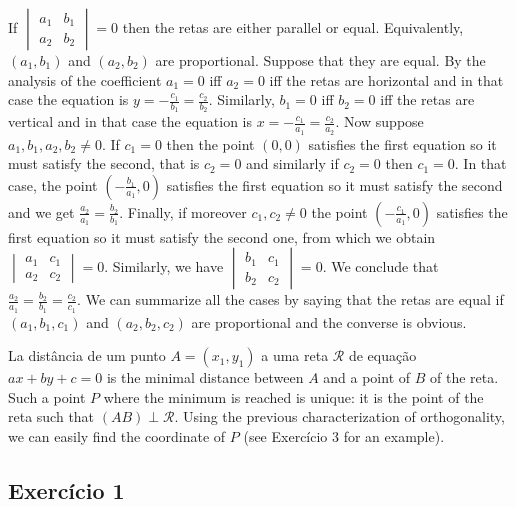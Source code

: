 If $\begin{vmatrix}
a_1 & b_1 \\
a_2 & b_2
\end{vmatrix} = 0$ then the retas are either parallel or equal. Equivalently,
$(a_1,b_1)$ and $(a_2,b_2)$ are proportional.
Suppose that they are equal. By the analysis of the coefficient
$a_1 = 0$ iff $a_2 = 0$ iff the retas are horizontal and in that case
the equation is $y = -\frac{c_1}{b_1} = \frac{c_2}{b_2}$.
Similarly, $b_1 = 0$ iff $b_2 = 0$ iff the retas are vertical
and in that case
the equation is $x = -\frac{c_1}{a_1} = \frac{c_2}{a_2}$.
Now suppose $a_1, b_1, a_2, b_2 \neq 0$. If $c_1 = 0$ then the point $(0,0)$
satisfies the first equation so it must satisfy the second, that is $c_2 = 0$
and similarly if $c_2=0$ then $c_1=0$. In that case, the point
$\left(-\frac{b_1}{a_1}, 0\right)$ satisfies the first equation so
it must satisfy the second and we get $\frac{a_2}{a_1} = \frac{b_2}{b_1}$.
Finally, if moreover $c_1,c_2 \neq 0$ the point
$\left(-\frac{c_1}{a_1}, 0\right)$ satisfies the first equation so it must
satisfy the second one, from which we obtain
$\begin{vmatrix}
a_1 & c_1 \\
a_2 & c_2
\end{vmatrix} = 0$. Similarly, we have $\begin{vmatrix}
b_1 & c_1 \\
b_2 & c_2
\end{vmatrix} = 0$. We conclude that
$\frac{a_2}{a_1} = \frac{b_2}{b_1} = \frac{c_2}{c_1}$. We can summarize all the
cases by saying that the retas are equal if
$(a_1,b_1,c_1)$ and $(a_2,b_2,c_2)$ are proportional and the converse is obvious.

La distância de um punto $A=(x_1,y_1)$ a uma reta $\mathcal R$
de equação $ax+by+c=0$
is the minimal distance between $A$ and a point of $B$ of the reta.
Such a point $P$ where the minimum is reached is unique: it is the point
of the reta such that $(AB) \perp \mathcal R$. Using the previous
characterization of orthogonality, we can easily find the coordinate of $P$
(see Exercício 3 for an example).

\subsection*{Exercício 1}


